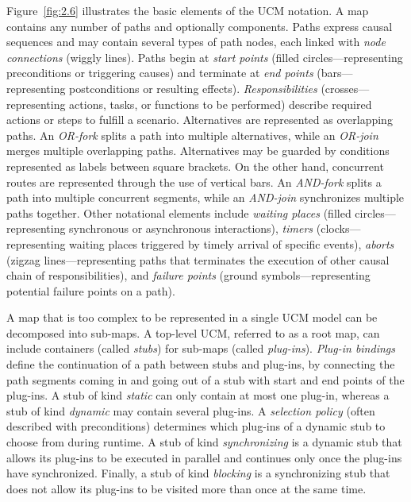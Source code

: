 Figure~\ref{fig:2.6} illustrates the basic elements of the UCM notation. A map contains any number of paths and optionally components. Paths express causal sequences and may contain several types of path nodes, each linked with \emph{node connections} (wiggly lines). Paths begin at \emph{start points} (filled circles---representing preconditions or triggering causes) and terminate at \emph{end points} (bars---representing postconditions or resulting effects). \emph{Responsibilities} (crosses---representing actions, tasks, or functions to be performed) describe required actions or steps to fulfill a scenario. Alternatives are represented as overlapping paths. An \emph{OR-fork} splits a path into multiple alternatives, while an \emph{OR-join} merges multiple overlapping paths. Alternatives may be guarded by conditions represented as labels between square brackets. On the other hand, concurrent routes are represented through the use of vertical bars. An \emph{AND-fork} splits a path into multiple concurrent segments, while an \emph{AND-join} synchronizes multiple paths together. Other notational elements include \emph{waiting places} (filled circles---representing synchronous or asynchronous interactions), \emph{timers} (clocks---representing waiting places triggered by timely arrival of specific events), \emph{aborts} (zigzag lines---representing paths that terminates the execution of other causal chain of responsibilities), and \emph{failure points} (ground symbols---representing potential failure points on a path).

A map that is too complex to be represented in a single UCM model can be decomposed into sub-maps. A top-level UCM, referred to as a root map, can include containers (called \emph{stubs}) for sub-maps (called \emph{plug-ins}). \emph{Plug-in bindings} define the continuation of a path between stubs and plug-ins, by connecting the path segments coming in and going out of a stub with start and end points of the plug-ins. A stub of kind \emph{static} can only contain at most one plug-in, whereas a stub of kind \emph{dynamic} may contain several plug-ins. A \emph{selection policy} (often described with preconditions) determines which plug-ins of a dynamic stub to choose from during runtime. A stub of kind \emph{synchronizing} is a dynamic stub that allows its plug-ins to be executed in parallel and continues only once the plug-ins have synchronized. Finally, a stub of kind \emph{blocking} is a synchronizing stub that does not allow its plug-ins to be visited more than once at the same time.

